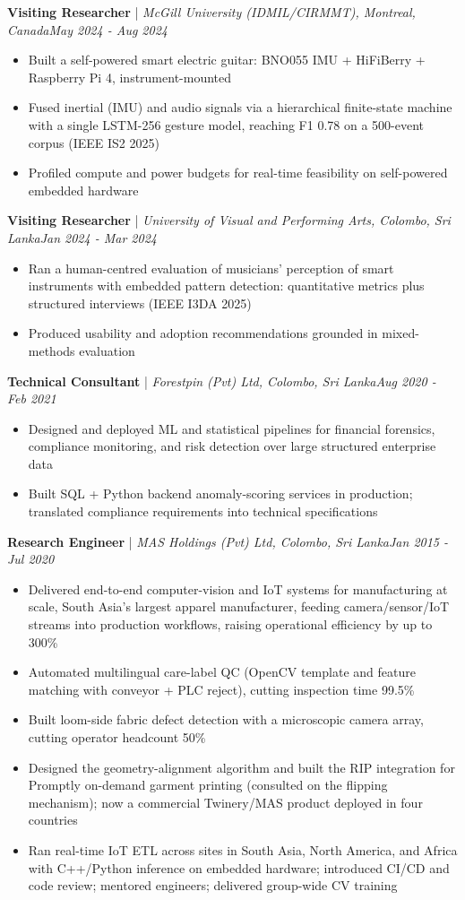 \documentclass[11pt]{article}
\newenvironment{cvrole}[5]{%
  \par\noindent\textbf{\large #1} | \textit{\small #2, #3}\hfill \textit{\small #4 - #5}\par
  \begin{itemize}[leftmargin=2em, itemsep=-0.3em, topsep=-0.5em]%
}{%
  \end{itemize}\par\noindent\mbox{}\par\vspace{0.1em}%
}
\begin{document}
\begin{cvrole}{Visiting Researcher}{McGill University (IDMIL/CIRMMT)}{Montreal, Canada}{May 2024}{Aug 2024}
    \item Built a self-powered smart electric guitar: BNO055 IMU + HiFiBerry + Raspberry Pi 4, instrument-mounted
    \item Fused inertial (IMU) and audio signals via a hierarchical finite-state machine with a single LSTM-256 gesture model, reaching F1 0.78 on a 500-event corpus (IEEE IS2 2025)
    \item Profiled compute and power budgets for real-time feasibility on self-powered embedded hardware
\end{cvrole}

\begin{cvrole}{Visiting Researcher}{University of Visual and Performing Arts}{Colombo, Sri Lanka}{Jan 2024}{Mar 2024}
    \item Ran a human-centred evaluation of musicians' perception of smart instruments with embedded pattern detection: quantitative metrics plus structured interviews (IEEE I3DA 2025)
    \item Produced usability and adoption recommendations grounded in mixed-methods evaluation
\end{cvrole}

\begin{cvrole}{Technical Consultant}{Forestpin (Pvt) Ltd}{Colombo, Sri Lanka}{Aug 2020}{Feb 2021}
    \item Designed and deployed ML and statistical pipelines for financial forensics, compliance monitoring, and risk detection over large structured enterprise data
    \item Built SQL + Python backend anomaly-scoring services in production; translated compliance requirements into technical specifications
\end{cvrole}

\begin{cvrole}{Research Engineer}{MAS Holdings (Pvt) Ltd}{Colombo, Sri Lanka}{Jan 2015}{Jul 2020}
    \item Delivered end-to-end computer-vision and IoT systems for manufacturing at scale, South Asia's largest apparel manufacturer, feeding camera/sensor/IoT streams into production workflows, raising operational efficiency by up to 300\%
    \item Automated multilingual care-label QC (OpenCV template and feature matching with conveyor + PLC reject), cutting inspection time 99.5\%
    \item Built loom-side fabric defect detection with a microscopic camera array, cutting operator headcount 50\%
    \item Designed the geometry-alignment algorithm and built the RIP integration for Promptly on-demand garment printing (consulted on the flipping mechanism); now a commercial Twinery/MAS product deployed in four countries
    \item Ran real-time IoT ETL across sites in South Asia, North America, and Africa with C++/Python inference on embedded hardware; introduced CI/CD and code review; mentored engineers; delivered group-wide CV training
\end{cvrole}
\end{document}
